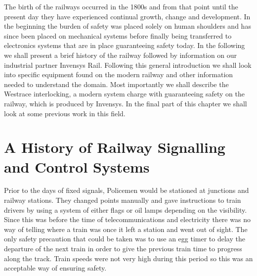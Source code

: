 The birth of the railways occurred in the 1800s and from that point until the present day they have experienced continual growth, change and development. In the beginning the burden of safety was placed solely on human shoulders and has since been placed on mechanical systems before finally being transferred to electronics systems that are in place guaranteeing safety today. In the following we shall present a brief history of the railway followed by information on our industrial partner Invensys Rail.  Following this general introduction we shall look into specific equipment found on the modern railway and other information needed to understand the domain. Most importantly we shall describe the Westrace interlocking, a modern system charge with guaranteeing safety on the railway, which is produced by Invensys. In the final part of this chapter we shall look at some previous work in this field.


\begin{comment}
From their birth in the 1800s to the present day, the railway and its control
systems have seen many advances. Its control and safety has gone from being a
completely manual human based system, to a mechanical system and finally to the electronic
system we see today. We will now look at a brief history of the railway
followed by information on our industrial partner Invensys Rail. We then look
more closely at modern railways and the equipment which constitutes
them. We also study
Westrace interlocking which is produced by Invensys and the
ladder logic programs which run on it. Finally, we look at some previous work
in this field.
\end{comment}

\section{ A History of Railway Signalling and Control Systems}
Prior to the days of fixed signals, Policemen would be stationed at
junctions and railway stations. They changed points manually and gave instructions to train drivers
by using a system of either flags or oil lamps depending on the
visibility. Since this was before the time of telecommunications and
electricity there was no way of telling where a train was once it left a
station and went out of sight. The only safety precaution that could be taken
was to use an egg timer to delay the departure of the next train in order to
give the previous train time to progress along the track. Train speeds were
not very high during this period so this was an acceptable way of ensuring safety.

